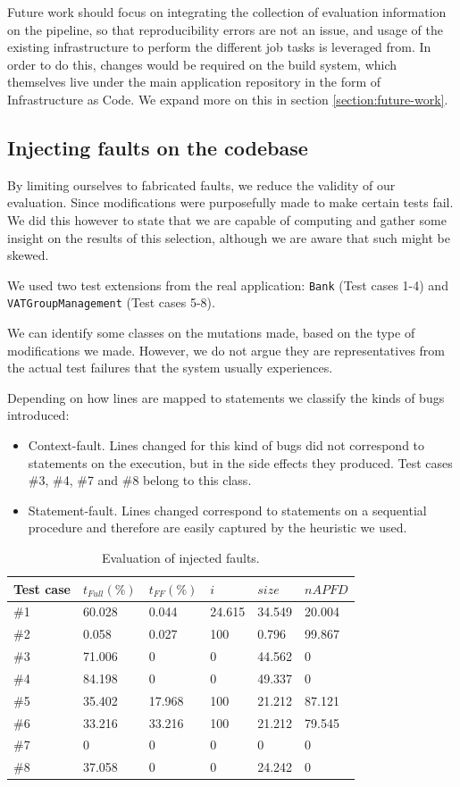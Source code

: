 \documentclass{article}
\begin{document}
Future work should focus on integrating the collection of evaluation information on the pipeline, so that reproducibility errors are not an issue, and usage of the existing infrastructure to perform the different job tasks is leveraged from. In order to do this, changes would be required on the build system, which themselves live under the main application repository in the form of Infrastructure as Code. We expand more on this in section \ref{section:future-work}.

\subsection{Injecting faults on the codebase}
By limiting ourselves to fabricated faults, we reduce the validity of our evaluation. Since modifications were purposefully made to make certain tests fail. We did this however to state that we are capable of computing and gather some insight on the results of this selection, although we are aware that such might be skewed.

We used two test extensions from the real application: \texttt{Bank} (Test cases 1-4) and \texttt{VATGroupManagement} (Test cases 5-8). 

We can identify some classes on the mutations made, based on the type of modifications we made. However, we do not argue they are representatives from the actual test failures that the system usually experiences.

Depending on how lines are mapped to statements we classify the kinds of bugs introduced:
\begin{itemize}
\item Context-fault. Lines changed for this kind of bugs did not correspond to statements on the execution, but in the side effects they produced. Test cases \#3, \#4, \#7 and \#8 belong to this class.
\item Statement-fault. Lines changed correspond to statements on a sequential procedure and therefore are easily captured by the heuristic we used. 
\end{itemize}

\begin{table}[h!]\label{table:evaluation}
  \centering
\begin{tabular}{||l|l|l|l|l|l||}
  Test case&$t_{Full} (\%)$ & $t_{FF} (\%)$ & $i$ & $size$ & $nAPFD$ \\ \hline
\#1&60.028 & 0.044 & 24.615 & 34.549 & 20.004\\
\#2&0.058 & 0.027 & 100 & 0.796 & 99.867 \\
\#3&71.006 & 0 & 0 & 44.562 & 0\\
\#4&84.198 & 0 & 0 & 49.337 & 0 \\
\#5&35.402 & 17.968 & 100 & 21.212 & 87.121 \\
\#6&33.216 & 33.216 & 100 & 21.212 & 79.545 \\
\#7&0 & 0 & 0 & 0 & 0 \\
\#8&37.058 & 0 & 0 & 24.242 & 0 \\
\hline
\end{tabular}
\caption{Evaluation of injected faults.}
\end{table}
\end{document}
